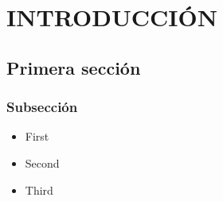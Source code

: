 \chapter{INTRODUCCIÓN}
\label{ch:intro}

\section{Primera sección}
{ \blindtext}



\subsection{Subsección}
{ \blindtext}

\begin{itemize}
    \item First
    \item Second
    \item Third
\end{itemize}

